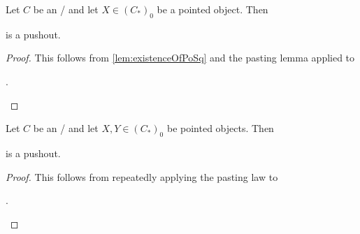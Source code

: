 \begin{corollary}\label{lem:poOfProductIsSuspension} %
    Let $C$ be an \inftytop/ and let $X\in \left(C_*\right)_0$ be a pointed object. 
    Then
    \begin{center}
    \end{center}
    is a pushout.
    \begin{proof}
        This follows from \cref{lem:existenceOfPoSq} and the pasting lemma applied to 
        \begin{center}
            \;.
        \end{center}
    \end{proof}
\end{corollary}
\begin{lemma}
    Let $C$ be an \inftytop/ and let $X,Y\in \left(C_*\right)_0$ be pointed objects. 
    Then 
    \begin{center}
    \end{center}
    is a pushout.
    \begin{proof}
        This follows from repeatedly applying the pasting law to 
        \begin{center}
            \;.
        \end{center}
    \end{proof}
\end{lemma}

